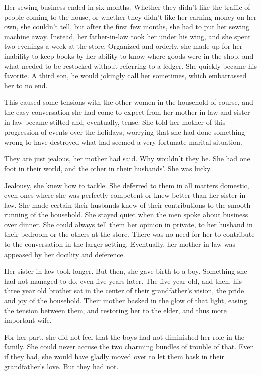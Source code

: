 \documentclass{article}
\newcommand{\egnote}{\todo[color=violet!30]}
\begin{document}
Her sewing business ended in six months. Whether they didn't like the traffic of people coming to the house, or whether they didn't like her earning money on her own, she couldn't tell, but after the first few months, she had to put her sewing machine away. Instead, her father-in-law took her under his wing, and she spent two evenings a week at the store. Organized and orderly, she made up for her inability to keep books by her ability to know where goods were in the shop, and what needed to be restocked without referring to a ledger. She quickly became his favorite. A third son, he would jokingly call her sometimes, which embarrassed her to no end. 

This caused some tensions with the other women in the household of course, and the easy conversation she had come to expect from her mother-in-law and sister-in-law became stilted and, eventually, tense. She told her mother of this progression of events over the holidays, worrying that she had done something wrong to have destroyed what had seemed a very fortunate marital situation. 

They are just jealous, her mother had said. Why wouldn't they be. She had one foot in their world, and the other in their husbands'. She was lucky. 

Jealousy, she knew how to tackle. She deferred to them in all matters domestic, even ones where she was perfectly competent or knew better than her sister-in-law. She made certain their husbands knew of their contributions to the smooth running of the household. She stayed quiet when the men spoke about business over dinner. She could always tell them her opinion in private, to her husband in their bedroom or the others at the store. There was no need for her to contribute to the conversation in the larger setting. Eventually, her mother-in-law was appeased by her docility and deference. 

Her sister-in-law took longer. But then, she gave birth to a boy. Something she\egnote{confusing pronoun} had not managed to do, even five years later. The five year old, and then, his three year old brother sat in the center of their grandfather's vision, the pride and joy of the household. Their mother basked in the glow of that light, easing the tension between them, and restoring her to the elder, and thus more important wife.

For her part, she did not feel that the boys had not\egnote{delete} diminished her role in the family. She could never accuse the two charming bundles of trouble of that. Even if they had, she would have gladly moved over to let them bask in their grandfather's love. But they had not. 
\end{document}
